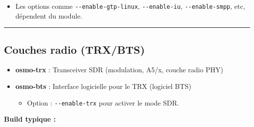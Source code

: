 \documentclass[
  french,
]{article}
\newenvironment{Shaded}{\begin{snugshade}}{\end{snugshade}}
\newcommand{\AttributeTok}[1]{\textcolor[rgb]{0.13,0.29,0.53}{#1}}
\newcommand{\BuiltInTok}[1]{#1}
\newcommand{\ExtensionTok}[1]{#1}
\newcommand{\FunctionTok}[1]{\textcolor[rgb]{0.13,0.29,0.53}{\textbf{#1}}}
\newcommand{\KeywordTok}[1]{\textcolor[rgb]{0.13,0.29,0.53}{\textbf{#1}}}
\newcommand{\NormalTok}[1]{#1}
\newcommand{\VariableTok}[1]{\textcolor[rgb]{0.00,0.00,0.00}{#1}}
\providecommand{\tightlist}{%
  \setlength{\itemsep}{0pt}\setlength{\parskip}{0pt}}
\begin{document}
\begin{itemize}
\tightlist
\item
  Les options comme \texttt{-\/-enable-gtp-linux},
  \texttt{-\/-enable-iu}, \texttt{-\/-enable-smpp}, etc, dépendent du
  module.
\end{itemize}

\begin{center}\rule{0.5\linewidth}{0.5pt}\end{center}

\subsection{Couches radio (TRX/BTS)}\label{couches-radio-trxbts}

\begin{itemize}
\item
  \textbf{osmo-trx} : Transceiver SDR (modulation, A5/x, couche radio
  PHY)
\item
  \textbf{osmo-bts} : Interface logicielle pour le TRX (logiciel BTS)

  \begin{itemize}
  \tightlist
  \item
    Option : \texttt{-\/-enable-trx} pour activer le mode SDR.
  \end{itemize}
\end{itemize}

\textbf{Build typique :}

\begin{Shaded}
\end{Shaded}
\end{document}
